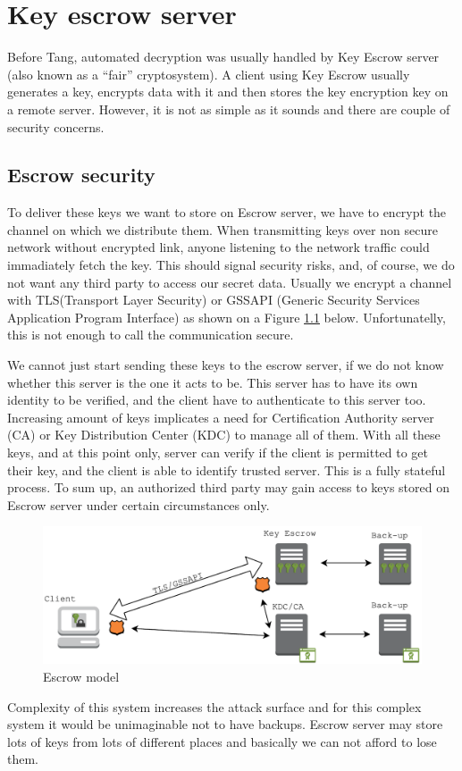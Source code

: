 \chapter{Key escrow server}\label{escrow}
Before Tang, automated decryption was usually handled by Key Escrow server (also known as a “fair” cryptosystem).
A client using Key Escrow usually generates a key, encrypts data with it and then stores the key encryption key on a remote server.
However, it is not as simple as it sounds and there are couple of security concerns.

\section{Escrow security}

To deliver these keys we want to store on Escrow server, we have to encrypt the channel on which we distribute them.
When transmitting keys over non secure network without encrypted link, anyone listening to the network traffic could immadiately fetch the key.
This should signal security risks, and, of course, we do not want any third party to access our secret data.
Usually we encrypt a channel with TLS(Transport Layer Security) or GSSAPI (Generic Security Services Application Program Interface) as shown on a Figure \ref{fig:escrowmodel} below.
Unfortunatelly, this is not enough to call the communication secure.

We cannot just start sending these keys to the escrow server, if we do not know whether this server is the one it acts to be.
This server has to have its own identity to be verified, and the client have to authenticate to this server too.
Increasing amount of keys implicates a need for Certification Authority server (CA) or Key Distribution Center (KDC) to manage all of them.
With all these keys, and at this point only, server can verify if the client is permitted to get their key, and the client is able to identify trusted server.
This is a fully stateful process.
To sum up, an authorized third party may gain access to keys stored on Escrow server under certain circumstances only.

\begin{figure}[h]
    \centering
    \includegraphics[scale=0.7]{figures/EscrowModel.pdf}
    \caption{Escrow model}
    \label{fig:escrowmodel}
\end{figure}

Complexity of this system increases the attack surface and for this complex system it would be unimaginable not to have backups.
Escrow server may store lots of keys from lots of different places and basically we can not afford to lose them.

